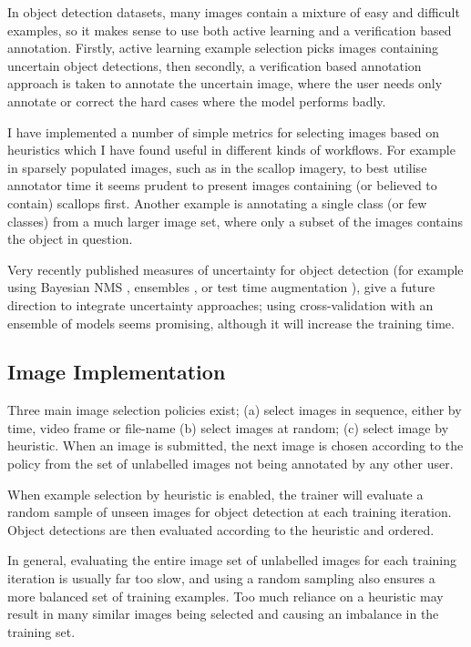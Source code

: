 In object detection datasets, many images contain a mixture of easy and difficult examples, so it makes sense to use both active learning and a verification based annotation.  Firstly, active learning example selection picks images containing uncertain object detections, then secondly, a verification based annotation approach is taken to annotate the uncertain image, where the user needs only annotate or correct the hard cases where the model performs badly.

I have implemented a number of simple metrics for selecting images based on heuristics which I have found useful in different kinds of workflows. For example in sparsely populated images, such as in the scallop imagery, to best utilise annotator time it seems prudent to present images containing (or believed to 
contain) scallops first. Another example is annotating a single class (or few classes) from a much larger image set, where only a subset of the images contains the object in question.

Very recently published measures of uncertainty for object detection (for example using Bayesian \gls{NMS} \cite{Harakeh}, ensembles \cite{Le2018}, or test time augmentation \cite{Wei2018}), give a future direction to integrate uncertainty approaches; using cross-validation with an ensemble of models seems promising, although it will increase the training time.

\subsection {Image Implementation}
\label{sec:example_implementation}

Three main image selection policies exist; (a) select images in sequence, either by time, video frame or file-name (b) select images at random; (c) select image by heuristic. When an image is submitted, the next image is chosen according to the policy from the set of unlabelled images not being annotated by any other user.

When example selection by heuristic is enabled, the trainer will evaluate a random sample of unseen images for object detection at each training iteration. Object detections are then evaluated according to the heuristic and ordered. 

In general, evaluating the entire image set of unlabelled images for each training iteration is usually far too slow, and using a random sampling also ensures a more balanced set of training examples. Too much reliance  on a heuristic may result in many similar images being selected and causing an imbalance in the training set.

